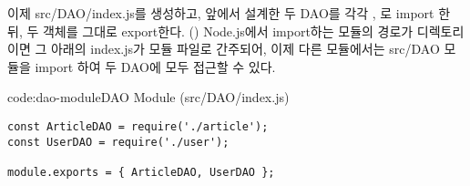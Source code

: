 이제 src/DAO/index.js를 생성하고, 앞에서 설계한 두 DAO를 각각 , 로 import 한 뒤, 두 객체를 그대로 export한다. () Node.js에서 import하는 모듈의 경로가 디렉토리이면 그 아래의 index.js가 모듈 파일로 간주되어, 이제 다른 모듈에서는 src/DAO 모듈을 import 하여 두 DAO에 모두 접근할 수 있다.

\begin{codeenv}{code:dao-module}{DAO Module (src/DAO/index.js)}\begin{verbatim}
const ArticleDAO = require('./article');
const UserDAO = require('./user');

module.exports = { ArticleDAO, UserDAO };
\end{verbatim}
\end{codeenv}
